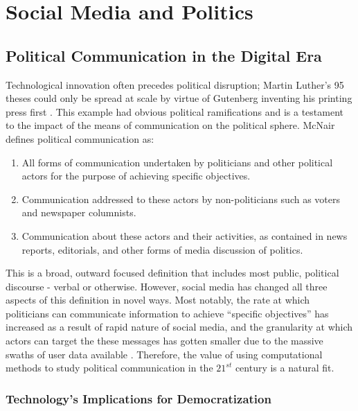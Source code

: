 \chapter{Social Media and Politics}\label{ch:SMandPolitics}

\section{Political Communication in the Digital Era}

Technological innovation often precedes political disruption; Martin Luther’s 95
theses could only be spread at scale by virtue of Gutenberg inventing his
printing press first \cite{gardels2019renovating}. This example had obvious
political ramifications and is a testament to the impact of the means of
communication on the political sphere. McNair defines political communication
as:

\begin{enumerate}
    \item All forms of communication undertaken by politicians and other
    political actors for the purpose of achieving specific objectives.
    \item Communication addressed to these actors by non-politicians such as
    voters and newspaper columnists.
    \item Communication about these actors and their activities, as contained in news reports, editorials, and other forms of media discussion of politics. \cite{mcnair2017introduction}
\end{enumerate} 

This is a broad, outward focused definition that includes most public, political
discourse - verbal or otherwise. However, social media has changed all three
aspects of this definition in novel ways. Most notably, the rate at which
politicians can communicate information to achieve “specific objectives” has
increased as a result of rapid nature of social media, and the granularity at
which actors can target the these messages has gotten smaller due to the massive
swaths of user data available \cite{nickerson2014political}. Therefore, the
value of using computational methods to study political communication in the
$21^{st}$ century is a natural fit.

\subsection{Technology's Implications for Democratization}

